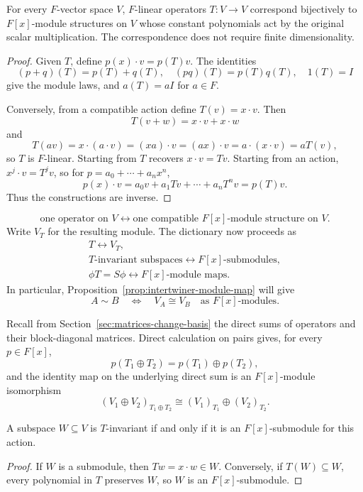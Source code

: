 \begin{theorem}
\label{thm:operator-module-correspondence}
For every \(F\)-vector space \(V\), \(F\)-linear operators \(T:V\to V\)
correspond bijectively to \(F[x]\)-module structures on \(V\) whose constant
polynomials act by the original scalar multiplication. The correspondence
does not require finite dimensionality.
\end{theorem}
\begin{proof}
Given \(T\), define \(p(x)\cdot v=p(T)v\). The identities
\[
(p+q)(T)=p(T)+q(T),\quad (pq)(T)=p(T)q(T),\quad 1(T)=I
\]
give the module laws, and \(a(T)=aI\) for \(a\in F\).

Conversely, from a compatible action define \(T(v)=x\cdot v\). Then
\[
T(v+w)=x\cdot v+x\cdot w
\]
and
\[
T(av)=x\cdot(a\cdot v)=(xa)\cdot v=(ax)\cdot v
=a\cdot(x\cdot v)=aT(v),
\]
so \(T\) is \(F\)-linear. Starting from \(T\) recovers \(x\cdot v=Tv\).
Starting from an action, \(x^j\cdot v=T^jv\), so for
\(p=a_0+\cdots+a_nx^n\),
\[
p(x)\cdot v=a_0v+a_1Tv+\cdots+a_nT^nv=p(T)v.
\]
Thus the constructions are inverse.
\end{proof}
\[
\boxed{\text{one operator on \(V\)}
\longleftrightarrow
\text{one compatible \(F[x]\)-module structure on \(V\)}}.
\]
Write \(V_T\) for the resulting module. The dictionary now proceeds as
\[
\begin{gathered}
T\longleftrightarrow V_T,\\
T\text{-invariant subspaces}\longleftrightarrow F[x]\text{-submodules},\\
\phi T=S\phi\longleftrightarrow F[x]\text{-module maps}.
\end{gathered}
\]
In particular, Proposition~\ref{prop:intertwiner-module-map} will give
\[
A\sim B\quad\Longleftrightarrow\quad V_A\cong V_B
\quad\text{as \(F[x]\)-modules}.
\]

Recall from Section~\ref{sec:matrices-change-basis} the direct sums of
operators and their block-diagonal matrices. Direct calculation on pairs
gives, for every \(p\in F[x]\),
\[
p(T_1\oplus T_2)=p(T_1)\oplus p(T_2),
\]
and the identity map on the underlying direct sum is an \(F[x]\)-module
isomorphism
\[
(V_1\oplus V_2)_{T_1\oplus T_2}
\cong (V_1)_{T_1}\oplus(V_2)_{T_2}.
\]

\begin{proposition}
A subspace \(W\subseteq V\) is \(T\)-invariant if and only if it is an
\(F[x]\)-submodule for this action.
\end{proposition}
\begin{proof}
If \(W\) is a submodule, then \(Tw=x\cdot w\in W\). Conversely, if
\(T(W)\subseteq W\), every polynomial in \(T\) preserves \(W\), so \(W\)
is an \(F[x]\)-submodule.
\end{proof}

